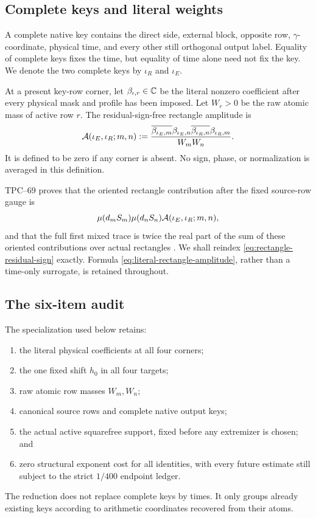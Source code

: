\subsection{Complete keys and literal weights}

A complete native key contains the direct side, external block, opposite
row, \(\gamma\)-coordinate, physical time, and every other still
orthogonal output label.  Equality of complete keys fixes the time, but
equality of time alone need not fix the key.  We denote the two complete
keys by \(\iota_R\) and \(\iota_E\).

At a present key-row corner, let \(\beta_{\iota,r}\in\mathbb C\) be the literal
nonzero coefficient after every physical mask and profile has been
imposed.  Let \(W_r>0\) be the raw atomic mass of active row \(r\).  The
residual-sign-free rectangle amplitude is
\begin{equation}
 \mathcal A(\iota_E,\iota_R;m,n)
 :=
 \frac{
 \overline{\beta_{\iota_E,m}}\beta_{\iota_E,n}
 \overline{\beta_{\iota_R,n}}\beta_{\iota_R,m}
 }{W_mW_n}.
 \label{eq:literal-rectangle-amplitude}
\end{equation}
It is defined to be zero if any corner is absent.  No sign, phase, or
normalization is averaged in this definition.

TPC--69 proves that the oriented rectangle contribution after the fixed
source-row gauge is
\begin{equation}
 \mu(d_mS_m)\mu(d_nS_n)
 \mathcal A(\iota_E,\iota_R;m,n),
 \label{eq:rectangle-residual-sign}
\end{equation}
and that the full first mixed trace is twice the real part of the sum of
these oriented contributions over actual rectangles
\citep{WangTPC69}.  We shall reindex \eqref{eq:rectangle-residual-sign}
exactly.  Formula \eqref{eq:literal-rectangle-amplitude}, rather than a
time-only surrogate, is retained throughout.

\subsection{The six-item audit}

The specialization used below retains:
\begin{enumerate}[label=\textup{(L1.\arabic*)},leftmargin=4em]
 \item the literal physical coefficients at all four corners;
 \item the one fixed shift \(h_0\) in all four targets;
 \item raw atomic row masses \(W_m,W_n\);
 \item canonical source rows and complete native output keys;
 \item the actual active squarefree support, fixed before any extremizer is
       chosen; and
 \item zero structural exponent cost for all identities, with every future
       estimate still subject to the strict \(1/400\) endpoint ledger.
\end{enumerate}
The reduction does not replace complete keys by times.  It only groups
already existing keys according to arithmetic coordinates recovered from
their atoms.
